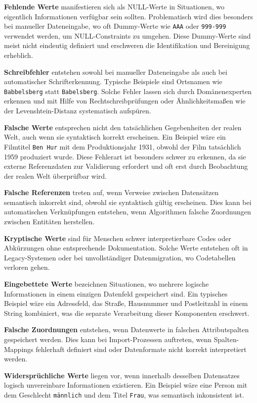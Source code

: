 \documentclass[
    a4paper,
    12pt,
    headinclude=true,
    BCOR=10mm,
]{scrreprt}
\begin{document}
\textbf{Fehlende Werte} manifestieren sich als NULL-Werte in Situationen, wo eigentlich Informationen verfügbar sein sollten. Problematisch wird dies besonders bei manueller Dateneingabe, wo oft Dummy-Werte wie \texttt{AAA} oder \texttt{999-999} verwendet werden, um NULL-Constraints zu umgehen. Diese Dummy-Werte sind meist nicht eindeutig definiert und erschweren die Identifikation und Bereinigung erheblich.

\textbf{Schreibfehler} entstehen sowohl bei manueller Dateneingabe als auch bei automatischer Schrifterkennung. Typische Beispiele sind Ortsnamen wie \texttt{Babbelsberg} statt \texttt{Babelsberg}. Solche Fehler lassen sich durch Domänenexperten erkennen und mit Hilfe von Rechtschreibprüfungen oder Ähnlichkeitsmaßen wie der Levenshtein-Distanz systematisch aufspüren.

\textbf{Falsche Werte} entsprechen nicht den tatsächlichen Gegebenheiten der realen Welt, auch wenn sie syntaktisch korrekt erscheinen. Ein Beispiel wäre ein Filmtitel \texttt{Ben Hur} mit dem Produktionsjahr 1931, obwohl der Film tatsächlich 1959 produziert wurde. Diese Fehlerart ist besonders schwer zu erkennen, da sie externe Referenzdaten zur Validierung erfordert und oft erst durch Beobachtung der realen Welt überprüfbar wird.

\textbf{Falsche Referenzen} treten auf, wenn Verweise zwischen Datensätzen semantisch inkorrekt sind, obwohl sie syntaktisch gültig erscheinen. Dies kann bei automatischen Verknüpfungen entstehen, wenn Algorithmen falsche Zuordnungen zwischen Entitäten herstellen.

\textbf{Kryptische Werte} sind für Menschen schwer interpretierbare Codes oder Abkürzungen ohne entsprechende Dokumentation. Solche Werte entstehen oft in Legacy-Systemen oder bei unvollständiger Datenmigration, wo Codetabellen verloren gehen.

\textbf{Eingebettete Werte} bezeichnen Situationen, wo mehrere logische Informationen in einem einzigen Datenfeld gespeichert sind. Ein typisches Beispiel wäre ein Adressfeld, das Straße, Hausnummer und Postleitzahl in einem String kombiniert, was die separate Verarbeitung dieser Komponenten erschwert.

\textbf{Falsche Zuordnungen} entstehen, wenn Datenwerte in falschen Attributspalten gespeichert werden. Dies kann bei Import-Prozessen auftreten, wenn Spalten-Mappings fehlerhaft definiert sind oder Datenformate nicht korrekt interpretiert werden.

\textbf{Widersprüchliche Werte} liegen vor, wenn innerhalb desselben Datensatzes logisch unvereinbare Informationen existieren. Ein Beispiel wäre eine Person mit dem Geschlecht \texttt{männlich} und dem Titel \texttt{Frau}, was semantisch inkonsistent ist.
\end{document}
